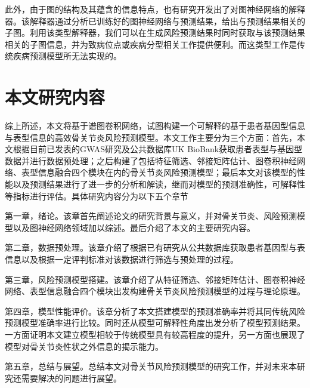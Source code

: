 此外，由于图的结构及其蕴含的信息特点，也有研究\cite{ying_gnnexplainer:_2019}开发出了对图神经网络的解释器。该解释器通过分析已训练好的图神经网络与预测结果，给出与预测结果相关的子图。利用该类型解释器，我们可以在生成风险预测结果时同时获取与该预测结果相关的子图信息，并为致病位点或疾病分型相关工作提供便利。而这类型工作是传统疾病预测模型所无法实现的。

\section{本文研究内容}
综上所述，本文将基于谱图卷积网络，试图构建一个可解释的基于患者基因型信息与表型信息的高效骨关节炎风险预测模型。本文工作主要分为三个方面：首先，本文根据目前已发表的GWAS研究及公共数据库UK BioBank获取患者表型与基因型数据并进行数据预处理；之后构建了包括特征筛选、邻接矩阵估计、图卷积神经网络、表型信息融合四个模块在内的骨关节炎风险预测模型；最后本文对该模型的性能以及预测结果进行了进一步的分析和解读，继而对模型的预测准确性，可解释性等指标进行评估。具体研究内容分为以下五个章节

第一章，绪论。该章首先阐述论文的研究背景与意义，并对骨关节炎、风险预测模型以及图神经网络领域加以综述。最后介绍了本文的主要研究内容。

第二章，数据预处理。该章介绍了根据已有研究从公共数据库获取患者基因型与表信息以及根据一定评判标准对该数据进行筛选与预处理的过程。

第三章，风险预测模型搭建。该章介绍了从特征筛选、邻接矩阵估计、图卷积神经网络、表型信息融合四个模块出发构建骨关节炎风险预测模型的过程与理论原理。

第四章，模型性能评价。该章分析了本文搭建模型的预测准确率并将其同传统风险预测模型准确率进行比较。同时还从模型可解释性角度出发分析了模型预测结果。一方面证明本文建立模型相较于传统模型具有较高程度的提升，另一方面也展现了模型对骨关节炎性状之外信息的揭示能力。

第五章，总结与展望。总结本文对骨关节风险预测模型的研究工作，并对未来本研究还需要解决的问题进行展望。